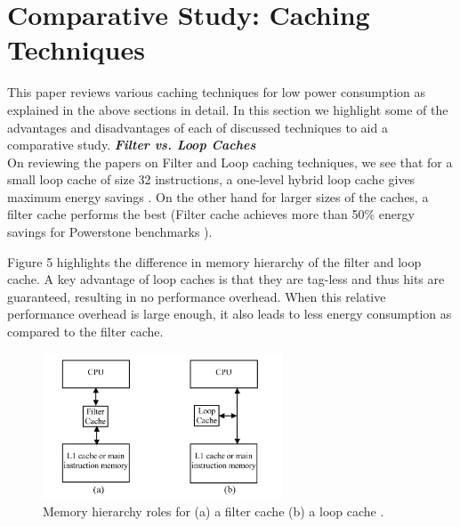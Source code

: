 \documentclass[conference]{IEEEtran}
\begin{document}
\section{Comparative Study: Caching Techniques}
This paper reviews various caching techniques for low power consumption as explained in the above sections in detail. In this section we highlight some of the advantages and disadvantages of each of discussed techniques to aid a comparative study.
\newline
\newline
\textit{\textbf{Filter vs. Loop Caches}}\\
On reviewing the papers on Filter and Loop caching techniques, we see that for a small loop cache of size 32 instructions, a one-level hybrid loop cache gives maximum energy savings \cite{1}. On the other hand for larger sizes of the caches, a filter cache performs the best (Filter cache achieves more than 50\% energy savings for Powerstone benchmarks \cite{fc1}).

Figure 5 highlights the difference in memory hierarchy of the filter and loop cache.
A key advantage of loop caches is that they are tag-less and thus hits are guaranteed, resulting in no performance overhead. When this relative performance overhead is large enough, it also leads to less energy consumption as compared to the filter cache.

\begin{figure}[!h]
	\centering
	\includegraphics[width=2.8in]{images/compare1.JPG}
	\caption{Memory hierarchy roles for (a) a filter cache (b) a loop cache \cite{1}.}
	\label{Comparison_Cache}
\end{figure}
\end{document}
